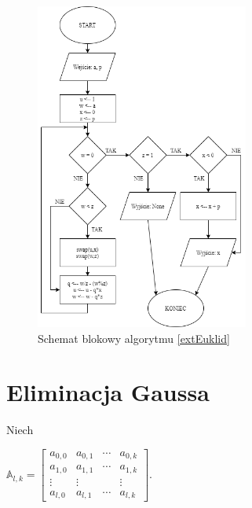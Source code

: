\documentclass[]{article}
\begin{document}
	\begin{figure}[H]
		\begin{center}
			\includegraphics[width=7cm]{alg 8.png} \caption{Schemat blokowy algorytmu \ref{extEuklid}}
		\end{center}
	\end{figure}


	\section{Eliminacja Gaussa}
		Niech 
		\newline
		\begin{center}
			\(\mathbb{A}_{l,k} = 
			\begin{bmatrix}
				a_{0,0} & a_{0,1} & \cdots & a_{0,k} \\
				a_{1,0} & a_{1,1} & \cdots & a_{1,k} \\
				\vdots & \vdots & & \vdots \\
				a_{l,0} & a_{l,1} & \cdots & a_{l,k} 
			\end{bmatrix} \). 
		\end{center}
\end{document}

